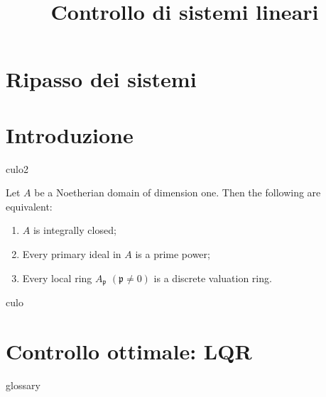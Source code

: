 \title{Controllo di sistemi lineari}
\maketitle
\label{sec:linear-systems-and-control}


\section{Ripasso dei sistemi}
\section{Introduzione}

culo2
\begin{thm}
    \label{thm:dedekind}
    Let \( A \) be a Noetherian domain of dimension one. Then the following are equivalent:
    \begin{enumerate}
        \item
        \( A \) is integrally closed;

        \item
        Every primary ideal in \( A \) is a prime power;

        \item
        Every local ring \( A_\mathfrak{p} \) \( (\mathfrak{p} \neq 0) \) is a discrete valuation ring.
    \end{enumerate}
\end{thm}

culo

\section{Controllo ottimale: LQR} \todo glossary